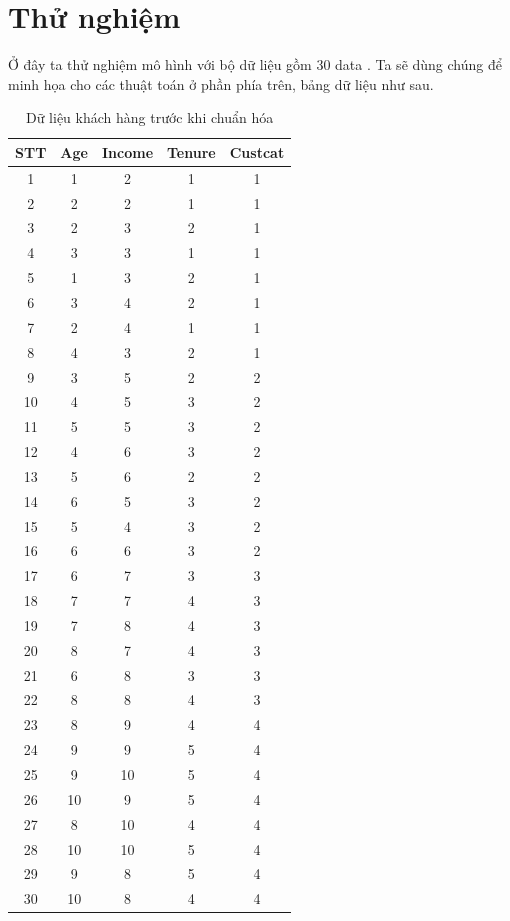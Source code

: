 \documentclass[12pt,a4paper]{article}
\begin{document}
\section{Thử nghiệm}
Ở đây ta thử nghiệm mô hình với bộ dữ liệu gồm 30 data . Ta sẽ dùng chúng để minh họa cho các thuật toán ở phần phía trên, bảng dữ liệu như sau.
\begin{table}[H]
\centering
\begin{tabular}{|c|c|c|c|c|}
\hline
\textbf{STT} & \textbf{Age} & \textbf{Income} & \textbf{Tenure} & \textbf{Custcat} \\ \hline
1  & 1  & 2  & 1 & 1 \\ \hline
2  & 2  & 2  & 1 & 1 \\ \hline
3  & 2  & 3  & 2 & 1 \\ \hline
4  & 3  & 3  & 1 & 1 \\ \hline
5  & 1  & 3  & 2 & 1 \\ \hline
6  & 3  & 4  & 2 & 1 \\ \hline
7  & 2  & 4  & 1 & 1 \\ \hline
8  & 4  & 3  & 2 & 1 \\ \hline
9  & 3  & 5  & 2 & 2 \\ \hline
10 & 4  & 5  & 3 & 2 \\ \hline
11 & 5  & 5  & 3 & 2 \\ \hline
12 & 4  & 6  & 3 & 2 \\ \hline
13 & 5  & 6  & 2 & 2 \\ \hline
14 & 6  & 5  & 3 & 2 \\ \hline
15 & 5  & 4  & 3 & 2 \\ \hline
16 & 6  & 6  & 3 & 2 \\ \hline
17 & 6  & 7  & 3 & 3 \\ \hline
18 & 7  & 7  & 4 & 3 \\ \hline
19 & 7  & 8  & 4 & 3 \\ \hline
20 & 8  & 7  & 4 & 3 \\ \hline
21 & 6  & 8  & 3 & 3 \\ \hline
22 & 8  & 8  & 4 & 3 \\ \hline
23 & 8  & 9  & 4 & 4 \\ \hline
24 & 9  & 9  & 5 & 4 \\ \hline
25 & 9  & 10 & 5 & 4 \\ \hline
26 & 10 & 9  & 5 & 4 \\ \hline
27 & 8  & 10 & 4 & 4 \\ \hline
28 & 10 & 10 & 5 & 4 \\ \hline
29 & 9  & 8  & 5 & 4 \\ \hline
30 & 10 & 8  & 4 & 4 \\ \hline
\end{tabular}
\caption{Dữ liệu khách hàng trước khi chuẩn hóa}
\end{table}
\end{document}

